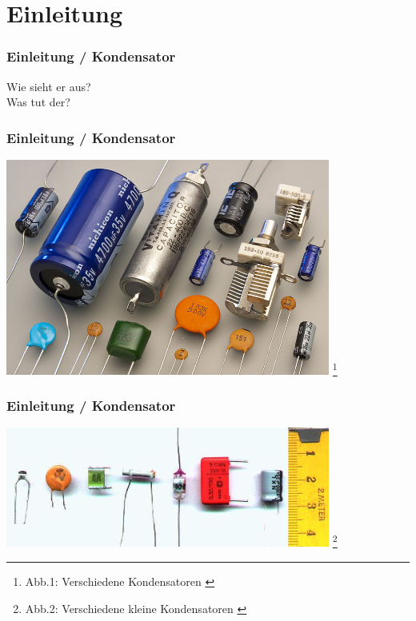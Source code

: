 

\subtitle{Technik Klasse E 05: \\
          Der Kondensator und seine Schaltungsarten \\[2em]}
\date{Stand 5.11.2014}


\section*{Einleitung}

\begin{frame}
    \frametitle{Einleitung / Kondensator}
    \begin{center}
        \Large{Wie sieht er aus?}\\
        \Large{Was tut der?}         
    \end{center}
\end{frame}


\begin{frame}
    \frametitle{Einleitung / Kondensator}

    \begin{center}
        \includegraphics[width=0.8\textwidth]{e05/Kondensator01.jpg}
        \footnote{Abb.1: Verschiedene Kondensatoren \cite{wmen}}
    \end{center}
 	

\end{frame}

\begin{frame}
    \frametitle{Einleitung / Kondensator}

    \begin{center}
        \includegraphics[width=0.8\textwidth]{e05/Kondensator02.jpg}
        \footnote{Abb.2: Verschiedene kleine Kondensatoren \cite{wmen}}
    \end{center}
 	

\end{frame}


